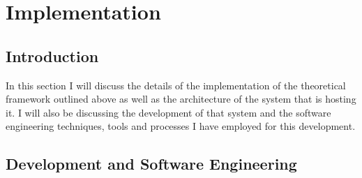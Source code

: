 \documentclass[]{final_report}
\begin{document}
\section{Implementation}
\subsection{Introduction}
In this section I will discuss the details of the implementation of the theoretical framework outlined above as well as the architecture of the system that is hosting it. I will also be discussing the development of that system and the software engineering techniques, tools and processes I have employed for this development.

\subsection{Development and Software Engineering}
\end{document}
